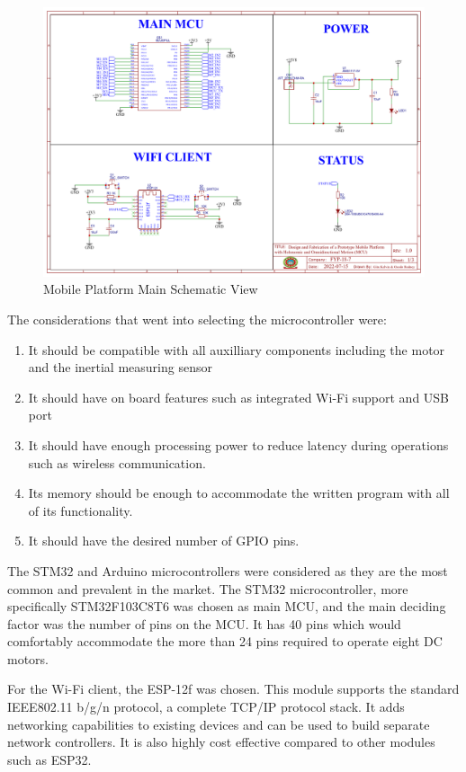 \begin{figure}[H]
    \centering
    \includegraphics[scale=0.4]{Figures/MPmain.png}
    \caption{Mobile Platform Main Schematic View}
    \label{fig:mobileplatformmain}
\end{figure}


The considerations that went into selecting the microcontroller were:
\begin{enumerate}[i]
    \item It should be compatible with all auxilliary components including the motor and the inertial measuring sensor
    \item It should have on board features such as integrated Wi-Fi support and USB port
    \item It should have enough processing power to reduce latency during operations such as wireless communication.
    \item Its memory should be enough to accommodate the written program with all of its functionality.
    \item It should have the desired number of GPIO pins.
\end{enumerate} 

\par
The STM32 and Arduino microcontrollers were considered as they are the most common and prevalent in the market. The STM32 microcontroller, more specifically STM32F103C8T6 was chosen as main \ac{MCU}, and the main deciding factor was the number of pins on the \ac{MCU}. It has 40 pins which would comfortably accommodate the more than 24 pins required to operate eight \ac{DC} motors.
\par
For the Wi-Fi client, the ESP-12f was chosen. This module supports the standard IEEE802.11 b/g/n protocol, a complete
TCP/IP protocol stack. It adds networking capabilities to existing devices and can be used to build separate network controllers. It is also highly cost effective compared to other modules such as ESP32.


